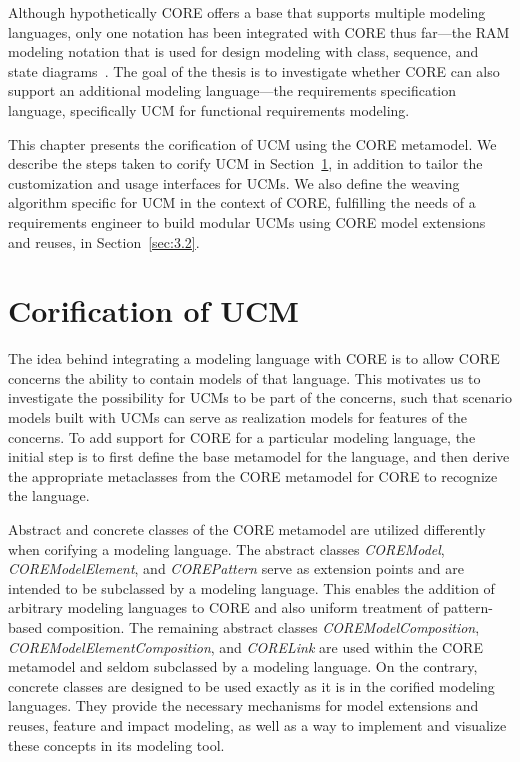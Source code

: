 
Although hypothetically CORE offers a base that supports multiple modeling languages, only one notation has been integrated with CORE thus far---the RAM modeling notation that is used for design modeling with class, sequence, and state diagrams~\cite{kienzle2010aspect, klein2007reusable}. The goal of the thesis is to investigate whether CORE can also support an additional modeling language---the requirements specification language, specifically UCM for functional requirements modeling.

This chapter presents the corification of UCM using the CORE metamodel. We describe the steps taken to corify UCM in Section~\ref{sec:3.1}, in addition to tailor the customization and usage interfaces for UCMs. We also define the weaving algorithm specific for UCM in the context of CORE, fulfilling the needs of a requirements engineer to build modular UCMs using CORE model extensions and reuses, in Section~\ref{sec:3.2}.

\section{Corification of UCM} \label{sec:3.1}

The idea behind integrating a modeling language with CORE is to allow CORE concerns the ability to contain models of that language. This motivates us to investigate the possibility for UCMs to be part of the concerns, such that scenario models built with UCMs can serve as realization models for features of the concerns. To add support for CORE for a particular modeling language, the initial step is to first define the base metamodel for the language, and then derive the appropriate metaclasses from the CORE metamodel for CORE to recognize the language.

Abstract and concrete classes of the CORE metamodel are utilized differently when corifying a modeling language. The abstract classes \textit{\cls COREModel}, \textit{\cls COREModelElement}, and \textit{\cls COREPattern} serve as extension points and are intended to be subclassed by a modeling language. This enables the addition of arbitrary modeling languages to CORE and also uniform treatment of pattern-based composition. The remaining abstract classes \textit{\cls COREModelComposition}, \textit{\cls COREModelElementComposition}, and \textit{\cls CORELink} are used within the CORE metamodel and seldom subclassed by a modeling language. On the contrary, concrete classes are designed to be used exactly as it is in the corified modeling languages. They provide the necessary mechanisms for model extensions and reuses, feature and impact modeling, as well as a way to implement and visualize these concepts in its modeling tool.

